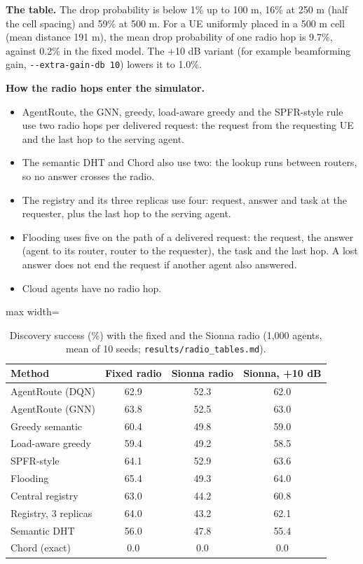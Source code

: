 \documentclass[journal]{IEEEtran}
\begin{document}
\textbf{The table.} The drop probability is below 1\% up to 100 m, 16\% at 250 m (half the cell spacing) and 59\% at 500 m. For a UE uniformly placed in a 500 m cell (mean distance 191 m), the mean drop probability of one radio hop is 9.7\%, against 0.2\% in the fixed model. The +10 dB variant (for example beamforming gain, \texttt{-{}-extra-gain-db 10}) lowers it to 1.0\%.

\textbf{How the radio hops enter the simulator.}

\begin{itemize}
\item AgentRoute, the GNN, greedy, load-aware greedy and the SPFR-style rule use two radio hops per delivered request: the request from the requesting UE and the last hop to the serving agent.
\item The semantic DHT and Chord also use two: the lookup runs between routers, so no answer crosses the radio.
\item The registry and its three replicas use four: request, answer and task at the requester, plus the last hop to the serving agent.
\item Flooding uses five on the path of a delivered request: the request, the answer (agent to its router, router to the requester), the task and the last hop. A lost answer does not end the request if another agent also answered.
\item Cloud agents have no radio hop.
\end{itemize}

\begin{table}[!t]
\centering
\caption{Discovery success (\%) with the fixed and the Sionna radio (1,000 agents, mean of 10 seeds; \texttt{results/\allowbreak radio\_\allowbreak tables.md}).}
\label{tab:13}
\scriptsize
\begin{adjustbox}{max width=\columnwidth}
\begin{tabular}{lccc}
\toprule
Method & Fixed radio & Sionna radio & Sionna, +10 dB \\
\midrule
AgentRoute (DQN) & 62.9 & 52.3 & 62.0 \\
AgentRoute (GNN) & 63.8 & 52.5 & 63.0 \\
Greedy semantic & 60.4 & 49.8 & 59.0 \\
Load-aware greedy & 59.4 & 49.2 & 58.5 \\
SPFR-style & 64.1 & 52.9 & 63.6 \\
Flooding & 65.4 & 49.3 & 64.0 \\
Central registry & 63.0 & 44.2 & 60.8 \\
Registry, 3 replicas & 64.0 & 43.2 & 62.1 \\
Semantic DHT & 56.0 & 47.8 & 55.4 \\
Chord (exact) & 0.0 & 0.0 & 0.0 \\
\bottomrule
\end{tabular}
\end{adjustbox}
\end{table}
\end{document}
